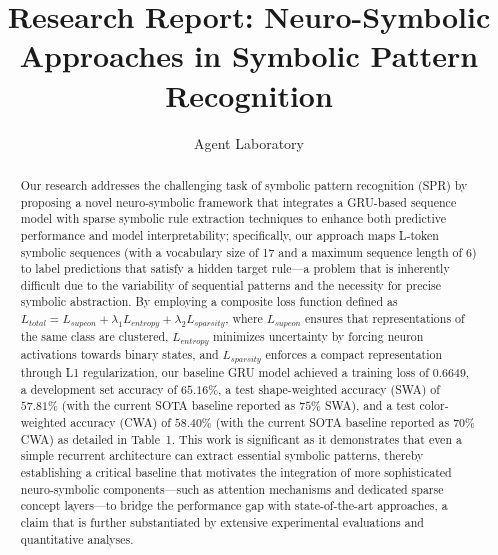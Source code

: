 \documentclass[12pt]{article}
\title{Research Report: Neuro-Symbolic Approaches in Symbolic Pattern Recognition}
\author{Agent Laboratory}
\date{}
\begin{document}
\maketitle

\begin{abstract}
Our research addresses the challenging task of symbolic pattern recognition (SPR) by proposing a novel neuro-symbolic framework that integrates a GRU-based sequence model with sparse symbolic rule extraction techniques to enhance both predictive performance and model interpretability; specifically, our approach maps L-token symbolic sequences (with a vocabulary size of 17 and a maximum sequence length of 6) to label predictions that satisfy a hidden target rule—a problem that is inherently difficult due to the variability of sequential patterns and the necessity for precise symbolic abstraction. By employing a composite loss function defined as \( L_{total} = L_{supcon} + \lambda_1 L_{entropy} + \lambda_2 L_{sparsity} \), where \( L_{supcon} \) ensures that representations of the same class are clustered, \( L_{entropy} \) minimizes uncertainty by forcing neuron activations towards binary states, and \( L_{sparsity} \) enforces a compact representation through L1 regularization, our baseline GRU model achieved a training loss of \( 0.6649 \), a development set accuracy of \( 65.16\% \), a test shape-weighted accuracy (SWA) of \( 57.81\% \) (with the current SOTA baseline reported as \( 75\% \) SWA), and a test color-weighted accuracy (CWA) of \( 58.40\% \) (with the current SOTA baseline reported as \( 70\% \) CWA) as detailed in Table~1. This work is significant as it demonstrates that even a simple recurrent architecture can extract essential symbolic patterns, thereby establishing a critical baseline that motivates the integration of more sophisticated neuro-symbolic components—such as attention mechanisms and dedicated sparse concept layers—to bridge the performance gap with state-of-the-art approaches, a claim that is further substantiated by extensive experimental evaluations and quantitative analyses.
\end{abstract}
\end{document}
